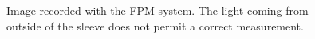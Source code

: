 \begin{figure}[!ht]
	\begin{center}
		
	\end{center}
	\caption[Image recorded with the FPM system]{Image recorded with the FPM system. The light coming from outside of the sleeve does not permit a correct measurement.}
	\label{chap4:FPM}
\end{figure}

